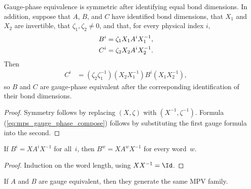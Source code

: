 \begin{lemma}
    \label{lem:gauge_phase_equiv_cast_compose}
    \leanok
    Gauge-phase equivalence is symmetric after identifying equal bond
    dimensions. In addition, suppose that $A$, $B$, and $C$ have identified bond
    dimensions, that $X_1$ and $X_2$ are invertible, that
    $\zeta_1,\zeta_2\ne0$, and that, for every physical index $i$,
    \begin{align}
        B^i
         & =\zeta_1X_1A^iX_1^{-1},\notag \\
        C^i
         & =\zeta_2X_2A^iX_2^{-1}.
        \notag
    \end{align}
    Then
    \begin{align}
        C^i
         & =(\zeta_2\zeta_1^{-1})(X_2X_1^{-1})
        B^i(X_1X_2^{-1}),
        \label{eq:mps_gauge_phase_compose}
    \end{align}
    so $B$ and $C$ are gauge-phase equivalent after the corresponding
    identification of their bond dimensions.
\end{lemma}

\begin{proof}\leanok
    Symmetry follows by replacing $(X,\zeta)$ with
    $(X^{-1},\zeta^{-1})$. Formula (\ref{eq:mps_gauge_phase_compose}) follows
    by substituting the first gauge formula into the second.
\end{proof}

\begin{lemma}\label{lem:eval_word_gauge}
    \leanok
    If $B^i = X A^i X^{-1}$ for all~$i$, then
    $B^w = X A^w X^{-1}$ for every word~$w$.
\end{lemma}

\begin{proof}\leanok
    Induction on the word length, using $X X^{-1} = \Id$.
\end{proof}

\begin{theorem}\label{thm:gauge_invariance}
    \leanok
    If $A$ and $B$ are gauge equivalent, then they generate the same
    MPV family.
\end{theorem}

